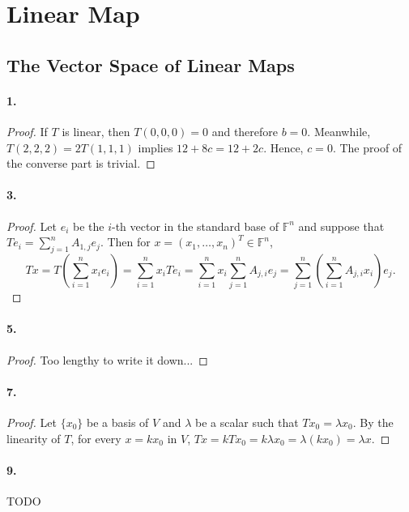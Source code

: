 \section{Linear Map}
\subsection{The Vector Space of Linear Maps}
  \paragraph{1.}
  \begin{proof}
    If $T$ is linear, then $T(0,0,0)=0$ and therefore $b=0$. Meanwhile, 
    $T(2,2,2)=2T(1,1,1)$ implies $12+8c=12+2c$. Hence, $c=0$. The proof of the 
    converse part is trivial.
  \end{proof}

  \paragraph{3.}
  \begin{proof}
    Let $e_i$ be the $i$-th vector in the standard base of $\mathbb{F}^n$ and 
    suppose that $Te_i = \sum_{j=1}^n A_{1,j}e_j$. Then for $x=(x_1,\dots,x_n)^T 
    \in\mathbb{F}^n$,
    \[
      Tx = T\left(\sum_{i=1}^n x_ie_i\right) = \sum_{i=1}^n x_iTe_i =
      \sum_{i=1}^n x_i\sum_{j=1}^nA_{j,i}e_j = 
      \sum_{j=1}^n\left(\sum_{i=1}^nA_{j,i}x_i\right) e_j.
    \]
  \end{proof}

  \paragraph{5.}
  \begin{proof}
    Too lengthy to write it down...
  \end{proof}

  \paragraph{7.}
  \begin{proof}
    Let $\{x_0\}$ be a basis of $V$ and $\lambda$ be a scalar such that $Tx_0=
    \lambda x_0$. By the linearity of $T$, for every $x=kx_0$ in $V$, $Tx=kTx_0
    =k\lambda x_0=\lambda(kx_0)=\lambda x$.
  \end{proof}

  \paragraph{9.}
  \begin{solution}
    TODO
  \end{solution}

